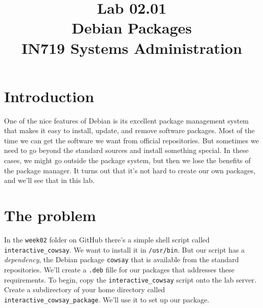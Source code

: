 \documentclass{article}
\begin{document}
\title{Lab 02.01\\Debian Packages\\IN719 Systems Administration}
\date{}
\maketitle

\section{Introduction}
One of the nice features of Debian is its excellent package management system
that makes it easy to install, update, and remove software packages. Most of 
the time we can get the software we want from official repositories. But 
sometimes we need to go beyond the standard sources and install something 
special. In these cases, we might go outside the package system, but then we 
lose the benefits of the package manager.  It turns out that it's not hard to 
create our own packages, and we'll see that in this lab.  

\section{The problem}
In the \texttt{week02} folder on GitHub there's a simple shell script called \texttt{interactive\_cowsay}. We want to
install it in \texttt{/usr/bin}. But our script has a \emph{dependency}, the Debian package \texttt{cowsay} that is available from
the standard repositories. We'll create a \texttt{.deb} fille for our packages that addresses these requirements. To
begin, copy the \texttt{interactive\_cowsay} script onto the lab server. Create a subdirectory of your home
directory called \texttt{interactive\_cowsay\_package}. We'll use it to set up our package.
\end{document}
